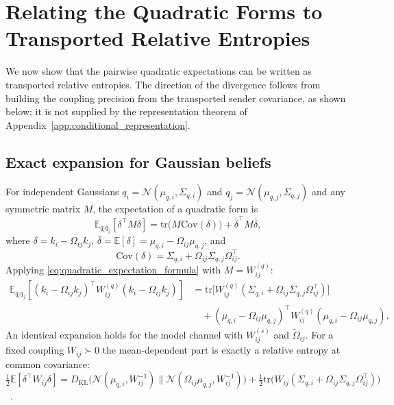 \documentclass[11pt]{article}
\begin{document}
\section{Relating the Quadratic Forms to Transported Relative Entropies}
We now show that the pairwise quadratic expectations can be written as transported relative entropies. The direction of the divergence follows from building the coupling precision from the transported sender covariance, as shown below; it is not supplied by the representation theorem of Appendix~\ref{app:conditional_representation}.
\subsection{Exact expansion for Gaussian beliefs}
For independent Gaussians $q_i = \mathcal{N}(\mu_{q,i},\Sigma_{q,i})$ and $q_j = \mathcal{N}(\mu_{q,j},\Sigma_{q,j})$ and any symmetric matrix $M$, the expectation of a quadratic form is
\begin{equation}
\mathbb{E}_{q_i q_j}[\delta^\top M \delta]
= \mathrm{tr}\big(M\mathrm{Cov}(\delta)\big)
+ \bar{\delta}^\top M \bar{\delta},
\label{eq:quadratic_expectation_formula}
\end{equation}
where $\delta = k_i - \Omega_{ij}k_j$, $\bar{\delta} = \mathbb{E}[\delta] = \mu_{q,i} - \Omega_{ij}\mu_{q,j}$, and
\begin{equation}
\mathrm{Cov}(\delta) = \Sigma_{q,i} + \Omega_{ij}\Sigma_{q,j}\Omega_{ij}^\top.
\end{equation}
Applying \eqref{eq:quadratic_expectation_formula} with $M = W^{(q)}_{ij}$:
\begin{equation}
\begin{aligned}
\mathbb{E}_{q_i q_j}
[(k_i-\Omega_{ij}k_j)^\top W^{(q)}_{ij}(k_i-\Omega_{ij}k_j)]
&=\mathrm{tr}\big[W^{(q)}_{ij}(\Sigma_{q,i}+\Omega_{ij}\Sigma_{q,j}\Omega_{ij}^\top)\big]\\
&\quad+(\mu_{q,i}-\Omega_{ij}\mu_{q,j})^\top
W^{(q)}_{ij}
(\mu_{q,i}-\Omega_{ij}\mu_{q,j}).
\end{aligned}
\label{eq:belief_quadratic_expansion}
\end{equation}
An identical expansion holds for the model channel with $W^{(s)}_{ij}$ and $\tilde{\Omega}_{ij}$. For a fixed coupling $W_{ij} \succ 0$ the mean-dependent part is exactly a relative entropy at common covariance: $\tfrac{1}{2}\mathbb{E}[\delta^\top W_{ij}\delta] = D_{\mathrm{KL}}\big(\mathcal{N}(\mu_{q,i}, W_{ij}^{-1})\|\mathcal{N}(\Omega_{ij}\mu_{q,j}, W_{ij}^{-1})\big) + \tfrac{1}{2}\mathrm{tr}\big(W_{ij}(\Sigma_{q,i} + \Omega_{ij}\Sigma_{q,j}\Omega_{ij}^\top)\big)$~\cite[Ch.~G5, edge relative entropy at fixed covariance]{DennisGaugeVFESuppG2026}.
\end{document}
